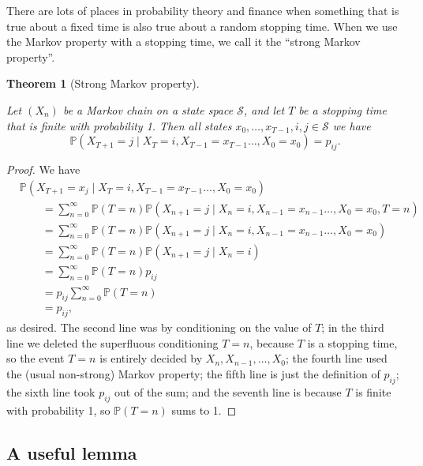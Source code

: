 \documentclass[
  a4paper,
]{article}
\newtheorem{theorem}{Theorem}[section]
\theoremstyle{definition}
\theoremstyle{definition}
\theoremstyle{definition}
\theoremstyle{remark}
\begin{document}
There are lots of places in probability theory and finance when something that is true about a fixed time is also true about a random stopping time. When we use the Markov property with a stopping time, we call it the ``strong Markov property''.

\begin{theorem}[Strong Markov property]
\protect\hypertarget{thm:strong-markov}{}\label{thm:strong-markov}

Let \((X_n)\) be a Markov chain on a state space \(\mathcal S\), and let \(T\) be a stopping time that is finite with probability 1. Then all states \(x_0, \dots,x_{T-1}, i, j \in \mathcal S\) we have
\[  \mathbb P(X_{T+1}=j \mid X_T=i, X_{T-1} = x_{T-1} \dots, X_0 = x_0) = p_{ij} . \]

\end{theorem}

\begin{proof}

We have
\begin{align*}
&\mathbb P(X_{T+1}={}x_j \mid X_T=i, X_{T-1} = x_{T-1} \dots, X_0 = x_0) \\
&\qquad{}= \sum_{n=0}^\infty \mathbb P(T = n) \mathbb P(X_{n+1}=j \mid X_n=i, X_{n-1} = x_{n-1} \dots, X_0 = x_0, T = n) \\
&\qquad{}= \sum_{n=0}^\infty \mathbb P(T = n) \mathbb P(X_{n+1}=j \mid X_n=i, X_{n-1} = x_{n-1} \dots, X_0 = x_0) \\
&\qquad{}= \sum_{n=0}^\infty \mathbb P(T = n) \mathbb P(X_{n+1}=j \mid X_n=i) \\
&\qquad{}= \sum_{n=0}^\infty \mathbb P(T = n) p_{ij}\\
&\qquad{}= p_{ij} \sum_{n=0}^\infty \mathbb P(T = n) \\
&\qquad{}= p_{ij} ,
\end{align*}
as desired. The second line was by conditioning on the value of \(T\); in the third line we deleted the superfluous conditioning \(T = n\), because \(T\) is a stopping time, so the event \(T = n\) is entirely decided by \(X_n, X_{n-1}, \dots, X_0\); the fourth line used the (usual non-strong) Markov property; the fifth line is just the definition of \(p_{ij}\); the sixth line took \(p_{ij}\) out of the sum; and the seventh line is because \(T\) is finite with probability 1, so \(\mathbb P(T = n)\) sums to 1.

\end{proof}

\hypertarget{S09-lemma}{%
\subsection{A useful lemma}\label{S09-lemma}}
\end{document}
